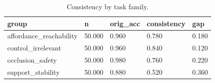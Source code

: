 \begin{table}[t]
\centering
\begin{tabular}{lllll}
\toprule
group & n & orig_acc & consistency & gap \\
\midrule
affordance_reachability & 50.000 & 0.960 & 0.780 & 0.180 \\
control_irrelevant & 50.000 & 0.960 & 0.840 & 0.120 \\
occlusion_safety & 50.000 & 0.980 & 0.760 & 0.220 \\
support_stability & 50.000 & 0.880 & 0.520 & 0.360 \\
\bottomrule
\end{tabular}
\caption{Consistency by task family.}
\end{table}
